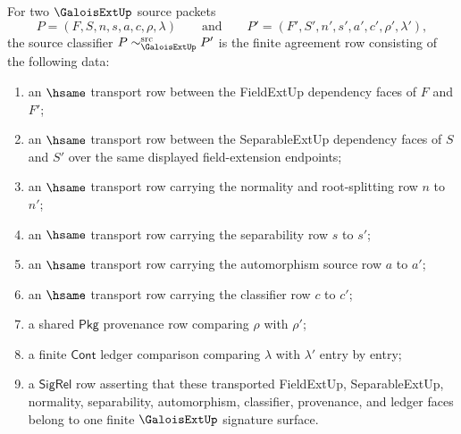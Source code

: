 \begin{definition}
\label{def:galoisext-source-classifier}
For two $\GaloisExtUp$ source packets
$$
P=(F,S,n,s,a,c,\rho,\lambda)
\qquad\text{and}\qquad
P'=(F',S',n',s',a',c',\rho',\lambda'),
$$
the source classifier $P\sim_{\GaloisExtUp}^{\mathrm{src}}P'$ is the finite
agreement row consisting of the following data:
\begin{enumerate}
  \item an $\hsame$ transport row between the FieldExtUp dependency faces of
  $F$ and $F'$;
  \item an $\hsame$ transport row between the SeparableExtUp dependency faces
  of $S$ and $S'$ over the same displayed field-extension endpoints;
  \item an $\hsame$ transport row carrying the normality and root-splitting
  row $n$ to $n'$;
  \item an $\hsame$ transport row carrying the separability row $s$ to $s'$;
  \item an $\hsame$ transport row carrying the automorphism source row $a$ to
  $a'$;
  \item an $\hsame$ transport row carrying the classifier row $c$ to $c'$;
  \item a shared $\mathsf{Pkg}$ provenance row comparing $\rho$ with $\rho'$;
  \item a finite $\mathsf{Cont}$ ledger comparison comparing $\lambda$ with
  $\lambda'$ entry by entry;
  \item a $\mathsf{SigRel}$ row asserting that these transported FieldExtUp,
  SeparableExtUp, normality, separability, automorphism, classifier,
  provenance, and ledger faces belong to one finite $\GaloisExtUp$ signature
  surface.
\end{enumerate}
\end{definition}

